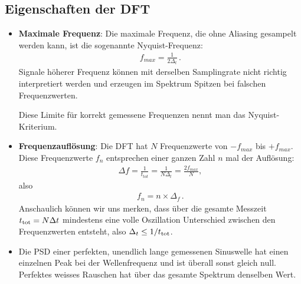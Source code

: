 \subsection{Eigenschaften der DFT}
\begin{itemize}
\item \textbf{Maximale Frequenz}: Die maximale Frequenz, die ohne Aliasing gesampelt werden kann, ist die sogenannte Nyquist-Frequenz:
        \begin{align}
        f_{max} = \frac{ 1 }{ 2 \Delta_t }\,.
        \label{eq:vl7-4}
        \end{align}
        Signale höherer Frequenz können mit derselben Samplingrate nicht richtig interpretiert werden und erzeugen im Spektrum Spitzen bei falschen Frequenzwerten.
        \begin{center}
        \begin{tcolorbox}[enhanced,width=6in,drop fuzzy shadow southwest,
            colframe=red!50!black,colback=red!05]
           Diese Limite für korrekt gemessene Frequenzen nennt man das Nyquist-Kriterium.
        \end{tcolorbox}
        \end{center}
        \item \textbf{Frequenzaufl\"osung}: Die DFT hat $N$ Frequenzwerte von $-f_{max}$ bis $+f_{max}$. Diese Frequenzwerte $f_n$ entsprechen einer ganzen Zahl $n$ mal der Aufl\"osung:
        \begin{align}
        \Delta f  = \frac{ 1 }{t_{tot}} = \frac{ 1 }{ N \Delta_t} = \frac{ 2 f_{max} }{ N },
        \label{eq:vl7-6}
        \end{align}
        also
        \begin{align}
        f_n = n \times \Delta_f\,.
        \label{eq:vl7-7}
        \end{align}
        Anschaulich k\"onnen wir uns merken, dass über die gesamte Messzeit $t_\mathrm{tot}=N\Delta t$ mindestens eine volle Oszillation Unterschied zwischen den Frequenzwerten entsteht, also $\Delta_t \leq 1/t_\mathrm{tot}$.
        \item Die PSD einer perfekten, unendlich lange gemessenen Sinuswelle hat einen einzelnen Peak bei der Wellenfrequenz und ist überall sonst gleich null. Perfektes weisses Rauschen hat über das gesamte Spektrum denselben Wert.
\end{itemize}


